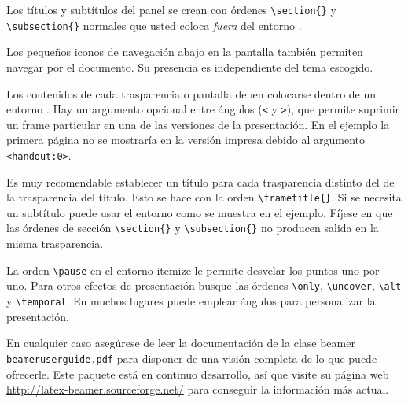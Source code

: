 Los títulos y subtítulos del panel se crean con órdenes
\verb|\section{}| y \verb|\subsection{}| normales que usted coloca
\emph{fuera} del entorno .

Los pequeños iconos de navegación abajo en la pantalla también
permiten navegar por el documento.  Su presencia es independiente del
tema escogido.

Los contenidos de cada trasparencia o pantalla deben colocarse dentro
de un entorno .  Hay un argumento opcional entre ángulos
(\verb|<| y \verb|>|), que permite suprimir un frame particular en una
de las versiones de la presentación.  En el ejemplo la primera página
no se mostraría en la versión impresa debido al argumento
\verb|<handout:0>|.

Es muy recomendable establecer un título para cada trasparencia
distinto del de la trasparencia del título.  Esto se hace con la orden
\verb|\frametitle{}|.  Si se necesita un subtítulo puede usar el
entorno  como se muestra en el ejemplo.  Fíjese en que las
órdenes de sección \verb|\section{}| y \verb|\subsection{}| no
producen salida en la misma trasparencia.

La orden \verb|\pause| en el entorno itemize le permite desvelar los
puntos uno por uno.  Para otros efectos de presentación busque las
órdenes \verb|\only|, \verb|\uncover|, \verb|\alt| y \verb|\temporal|.
En muchos lugares puede emplear ángulos para personalizar la
presentación.

En cualquier caso asegúrese de leer la documentación de la clase
beamer \texttt{beameruserguide.pdf} para disponer de una visión
completa de lo que puede ofrecerle.  Este paquete está en continuo
desarrollo, así que visite su página web
\href{http://latex-beamer.sourceforge.net/}{http://latex-beamer.sourceforge.net/}
para conseguir la información más actual.


